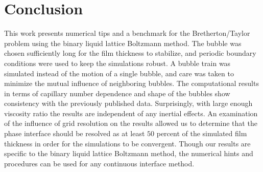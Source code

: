 \documentclass[preprint,12pt]{elsarticle}
\begin{document}
\section{Conclusion}
This work presents numerical tips and a benchmark for the
Bretherton/Taylor problem using the binary liquid lattice Boltzmann method. The bubble was chosen sufficiently long for the film
thickness to
stabilize, and periodic boundary conditions were used to keep the simulations robust.  A bubble
train was simulated instead of the motion of a single bubble, and care was taken to minimize
the mutual influence of neighboring bubbles. The computational
results in terms of capillary number dependence and shape of the bubbles show consistency with the
previously published data. Surprisingly, with large enough viscosity ratio the results are
independent of any inertial effects.  An examination of the influence of grid resolution on the results allowed
us to determine that the phase interface should be resolved as at least $50$ percent of the simulated film thickness
in order for the simulations to be convergent. Though our results are specific to the binary liquid lattice
Boltzmann method, the numerical hints and procedures can be used for any
continuous interface method.


%
%
\end{document}
